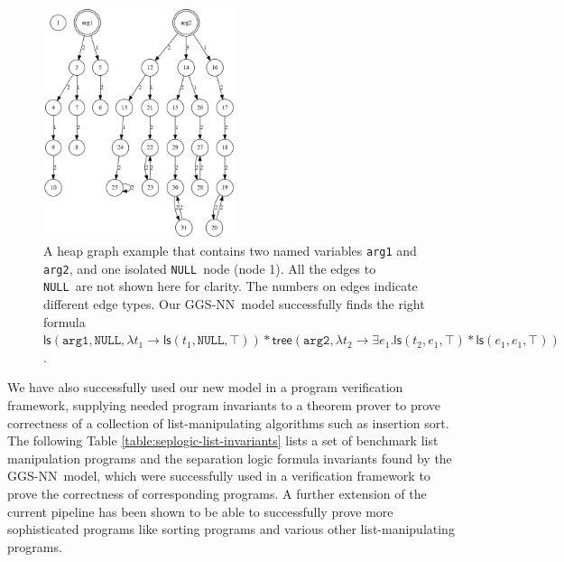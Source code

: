 \documentclass{article} %
\newcommand{\SLls}[0]{\ensuremath{\mathsf{ls}}}
\newcommand{\SLtree}[0]{\ensuremath{\mathsf{tree}}}
\newcommand{\SLNone}[0]{\ensuremath{\top}}
\newcommand{\SLnull}{\texttt{NULL}}
\newcommand{\OurMethodShort}{GGS-NN}
\begin{document}
\begin{figure}
    \begin{center}
        \includegraphics[width=0.5\textwidth]{figs/appendix-heap-graph-example.png}
    \end{center}
    \caption{A heap graph example that contains two named variables
        \texttt{arg1} and \texttt{arg2}, and one isolated \SLnull~node (node 1). All the
    edges to \SLnull~are not shown here for clarity. The numbers on edges
    indicate different edge types.  Our \OurMethodShort~model successfully
    finds the right
formula $\SLls(\texttt{arg1}, \SLnull, \lambda t_1 \rightarrow \SLls(t_1,
\SLnull, \SLNone)) * \SLtree(\texttt{arg2}, \lambda t_2 \rightarrow \exists
e_1. \SLls(t_2, e_1, \SLNone) * \SLls(e_1, e_1, \SLNone))$.}
    \label{fig:appendix-heap-graph-example}
\end{figure}


We have also successfully used our new model in a program verification
framework, supplying needed program invariants to a theorem prover to prove
correctness of a collection of list-manipulating algorithms such as insertion
sort.
The following Table \ref{table:seplogic-list-invariants} lists a set of benchmark list manipulation programs and
the separation logic formula invariants found by the \OurMethodShort~model,
which were successfully used in a verification framework to prove the
correctness of corresponding programs. A further extension of the current
pipeline has been shown to be able to successfully prove more sophisticated
programs like sorting programs and various other list-manipulating programs.
\end{document}
